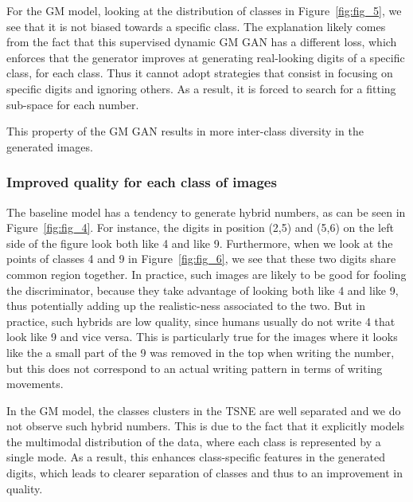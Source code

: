 \documentclass[10pt]{article}
\begin{document}
For the GM model, looking at the distribution of classes in Figure~\ref{fig:fig_5}, we see that it is not biased towards a specific class. The explanation likely comes from the fact that this supervised dynamic GM GAN has a different loss, which enforces that the generator improves at generating real-looking digits of a specific class, for each class. Thus it cannot adopt strategies that consist in focusing on specific digits and ignoring others. As a result, it is forced to search for a fitting sub-space for each number.

This property of the GM GAN results in more inter-class diversity in the generated images.

\subsubsection{Improved quality for each class of images}

The baseline model has a tendency to generate hybrid numbers, as can be seen in Figure~\ref{fig:fig_4}. For instance, the digits in position (2,5) and (5,6) on the left side of the figure look both like 4 and like 9. Furthermore, when we look at the points of classes 4 and 9 in Figure~\ref{fig:fig_6}, we see that these two digits share common region together. In practice, such images are likely to be good for fooling the discriminator, because they take advantage of looking both like 4 and like 9, thus potentially adding up the realistic-ness associated to the two. But in practice, such hybrids are low quality, since humans usually do not write 4 that look like 9 and vice versa. This is particularly true for the images where it looks like the a small part of the 9 was removed in the top when writing the number, but this does not correspond to an actual writing pattern in terms of writing movements.

In the GM model, the classes clusters in the TSNE are well separated and we do not observe such hybrid numbers. This is due to the fact that it explicitly models the multimodal distribution of the data, where each class is represented by a single mode. As a result, this enhances class-specific features in the generated digits, which leads to clearer separation of classes and thus to an improvement in quality.


\end{document}
